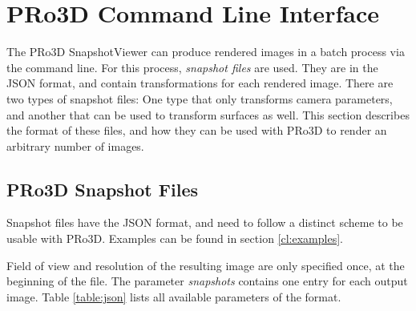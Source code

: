 \section{PRo3D Command Line Interface}

The PRo3D SnapshotViewer can produce rendered images in a batch process via the command line. For this process, \emph{snapshot files} are used. They are in the JSON format, and contain transformations for each rendered image. There are two types of snapshot files: One type that only transforms camera parameters, and another that can be used to transform surfaces as well. This section describes the format of these files, and how they can be used with PRo3D to render an arbitrary number of images.

\subsection{PRo3D Snapshot Files}
\label{sec:snapshots}

Snapshot files have the JSON format, and need to follow a distinct scheme to be usable with PRo3D. Examples can be found in section \ref{cl:examples}.

Field of view and resolution of the resulting image are only specified once, at the beginning of the file. The parameter \textit{snapshots} contains one entry for each output image. Table  \ref{table:json} lists all available parameters of the format.


